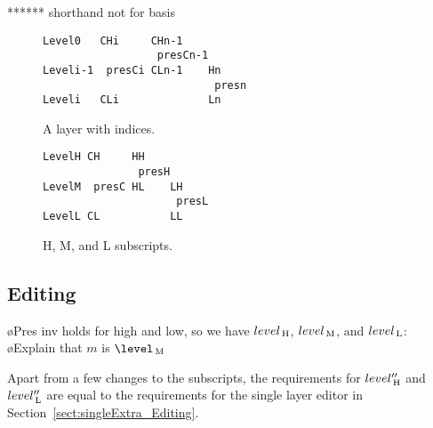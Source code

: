 ****** shorthand not for basis

\begin{figure}[h]
  \hfill
  \begin{minipage}[b]{.45\textwidth}
    \begin{center}  
\begin{small}\begin{verbatim}
Level0   CHi     CHn-1
                  presCn-1
Leveli-1  presCi CLn-1    Hn
                           presn
Leveli   CLi              Ln
\end{verbatim}\end{small}
      \caption{A layer with indices.} \label{indexedLayer}
    \end{center}
  \end{minipage}
  \hfill
  \begin{minipage}[b]{.45\textwidth}
    \begin{center}  
\begin{small}\begin{verbatim}
LevelH CH     HH
               presH
LevelM  presC HL    LH
                     presL
LevelL CL           LL
\end{verbatim}\end{small}
      \caption{H, M, and L subscripts.} \label{relativeLayer}
    \end{center}
  \end{minipage}
  \hfill
\end{figure}


\subsection{Editing} \label{sect:combinedExtra_Editing}

\bl
\o Pres inv holds for high and low, so we have $level_{\, \mathrm H}$, $level_{\, \mathrm M}$, and $level_{\, \mathrm L}$:
\o Explain that $m$ is $\level\M$
\el



Apart from a few changes to the subscripts, the requirements for $level''_{\, \mathrm H}$ and $level''_{\, \mathrm L}$ are equal to the requirements for the single layer editor in Section~\ref{sect:singleExtra_Editing}.

